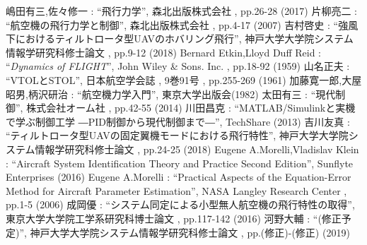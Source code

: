 
\begin{thebibliography}{99}


嶋田有三,佐々修一 : ``飛行力学'', 森北出版株式会社 , pp.26-28 (2017)
片柳亮二 : ``航空機の飛行力学と制御'', 森北出版株式会社 , pp.4-17 (2007)
吉村啓史 : ``強風下におけるティルトロータ型UAVのホバリング飛行'', 神戸大学大学院システム情報学研究科修士論文 , pp.9-12 (2018)
Bernard Etkin,Lloyd Duff Reid : ``\textit{Dynamics of FLIGHT}'', John Wiley & Sons. Inc. , pp.18-92 (1959)
山名正夫 : ``VTOLとSTOL'', 日本航空学会誌 , 9巻91号 , pp.255-269 (1961)
加藤寛一郎,大屋昭男,柄沢研治 : ``航空機力学入門'', 東京大学出版会(1982)
太田有三 : ``現代制御'', 株式会社オーム社 , pp.42-55 (2014)
川田昌克 : ``MATLAB/Simulinkと実機で学ぶ制御工学 ―PID制御から現代制御まで―'', TechShare (2013)
吉川友真 : ``ティルトロータ型UAVの固定翼機モードにおける飛行特性'', 神戸大学大学院システム情報学研究科修士論文 , pp.24-25 (2018)
Eugene A.Morelli,Vladislav Klein : ``Aircraft System Identification Theory and Practice Second Edition'', Sunflyte Enterprises (2016)
Eugene A.Morelli : ``Practical Aspects of the Equation-Error Method for Aircraft Parameter Estimation'', NASA Langley Research Center , pp.1-5 (2006)
成岡優 : ``システム同定による小型無人航空機の飛行特性の取得'', 東京大学大学院工学系研究科博士論文 , pp.117-142 (2016)
河野大輔 : ``(修正予定)'', 神戸大学大学院システム情報学研究科修士論文 , pp.(修正)-(修正) (2019)

\end{thebibliography}

\newpage
